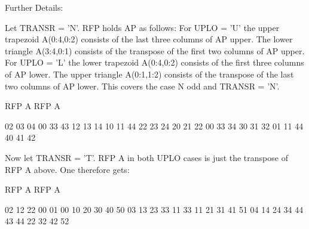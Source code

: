 \begin{DoxyParagraph}{Further Details\+: }
\begin{DoxyVerb}
  Let TRANSR = 'N'. RFP holds AP as follows:
  For UPLO = 'U' the upper trapezoid A(0:4,0:2) consists of the last
  three columns of AP upper. The lower triangle A(3:4,0:1) consists of
  the transpose of the first two columns of AP upper.
  For UPLO = 'L' the lower trapezoid A(0:4,0:2) consists of the first
  three columns of AP lower. The upper triangle A(0:1,1:2) consists of
  the transpose of the last two columns of AP lower.
  This covers the case N odd and TRANSR = 'N'.

         RFP A                   RFP A

        02 03 04                00 33 43
        12 13 14                10 11 44
        22 23 24                20 21 22
        00 33 34                30 31 32
        01 11 44                40 41 42

  Now let TRANSR = 'T'. RFP A in both UPLO cases is just the
  transpose of RFP A above. One therefore gets:

           RFP A                   RFP A

     02 12 22 00 01             00 10 20 30 40 50
     03 13 23 33 11             33 11 21 31 41 51
     04 14 24 34 44             43 44 22 32 42 52\end{DoxyVerb}
 
\end{DoxyParagraph}
